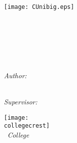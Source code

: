 \makeatletter
\begin{titlepage}
    \begin{minipage}[]{.5\textwidth}
        \texttt{[image: CUnibig.eps]} \\
    \end{minipage}
    \begin{minipage}[]{.5\textwidth}
        \begin{flushright}
            \address
        \end{flushright}
    \end{minipage}

    \vspace{2.5cm}
    \begin{center}
        \HRule \\\vspace{4mm}
        \huge{\@title}\\
        \HRule \\\vspace{3mm}
        \begin{minipage}[c]{.5\textwidth}
            \centering\normalsize{\subnotes}\\\vspace{3mm}
            \@date
        \end{minipage}
    \end{center}

    \vspace{1.75cm}\centering

    \begin{minipage}[t]{.3\textwidth}
        \raggedright\Large 
        \textit{Author:}\\
        \@author\\
    \end{minipage}
    \begin{minipage}[t]{.3\textwidth}
        \raggedleft\Large 
        \textit{Supervisor:}\\
        \supervisor
    \end{minipage}

    \vfill
    \begin{minipage}[c]{.4\textwidth}
        \centering
        \texttt{[image: \\collegecrest]} \\
        \Large {\it \college\ College}
    \end{minipage}
\end{titlepage}
\makeatother

